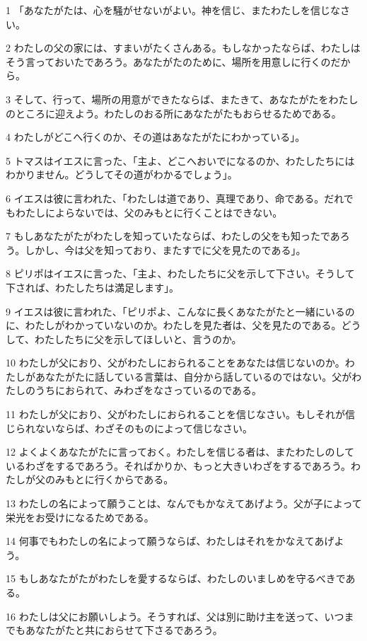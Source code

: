 \par 1 「あなたがたは、心を騒がせないがよい。神を信じ、またわたしを信じなさい。
\par 2 わたしの父の家には、すまいがたくさんある。もしなかったならば、わたしはそう言っておいたであろう。あなたがたのために、場所を用意しに行くのだから。
\par 3 そして、行って、場所の用意ができたならば、またきて、あなたがたをわたしのところに迎えよう。わたしのおる所にあなたがたもおらせるためである。
\par 4 わたしがどこへ行くのか、その道はあなたがたにわかっている」。
\par 5 トマスはイエスに言った、「主よ、どこへおいでになるのか、わたしたちにはわかりません。どうしてその道がわかるでしょう」。
\par 6 イエスは彼に言われた、「わたしは道であり、真理であり、命である。だれでもわたしによらないでは、父のみもとに行くことはできない。
\par 7 もしあなたがたがわたしを知っていたならば、わたしの父をも知ったであろう。しかし、今は父を知っており、またすでに父を見たのである」。
\par 8 ピリポはイエスに言った、「主よ、わたしたちに父を示して下さい。そうして下されば、わたしたちは満足します」。
\par 9 イエスは彼に言われた、「ピリポよ、こんなに長くあなたがたと一緒にいるのに、わたしがわかっていないのか。わたしを見た者は、父を見たのである。どうして、わたしたちに父を示してほしいと、言うのか。
\par 10 わたしが父におり、父がわたしにおられることをあなたは信じないのか。わたしがあなたがたに話している言葉は、自分から話しているのではない。父がわたしのうちにおられて、みわざをなさっているのである。
\par 11 わたしが父におり、父がわたしにおられることを信じなさい。もしそれが信じられないならば、わざそのものによって信じなさい。
\par 12 よくよくあなたがたに言っておく。わたしを信じる者は、またわたしのしているわざをするであろう。そればかりか、もっと大きいわざをするであろう。わたしが父のみもとに行くからである。
\par 13 わたしの名によって願うことは、なんでもかなえてあげよう。父が子によって栄光をお受けになるためである。
\par 14 何事でもわたしの名によって願うならば、わたしはそれをかなえてあげよう。
\par 15 もしあなたがたがわたしを愛するならば、わたしのいましめを守るべきである。
\par 16 わたしは父にお願いしよう。そうすれば、父は別に助け主を送って、いつまでもあなたがたと共におらせて下さるであろう。
